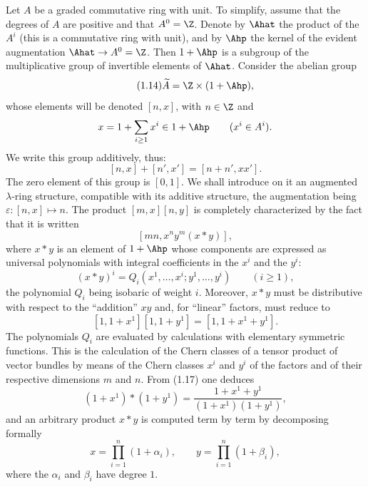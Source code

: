 Let $A$ be a graded commutative ring with unit. To simplify, assume that the degrees of $A$ are positive and that $A^0=\Z$. Denote by $\Ahat$ the product of the $A^i$ (this is a commutative ring with unit), and by $\Ahp$ the kernel of the evident augmentation $\Ahat\to A^0=\Z$. Then $1+\Ahp$ is a subgroup of the multiplicative group of invertible elements of $\Ahat$. Consider the abelian group
\begin{equation}\tag{1.14}
\widetilde A=\Z\times (1+\Ahp),
\end{equation}
whose elements will be denoted $[n,x]$, with $n\in\Z$ and
\[
x=1+\sum_{i\geq 1}x^i\in 1+\Ahp\qquad (x^i\in A^i).
\]
We write this group additively, thus:
\begin{equation}\tag{1.15}
[n,x]+[n',x']=[n+n',xx'].
\end{equation}
The zero element of this group is $[0,1]$. We shall introduce on it an augmented $\lambda$-ring structure, compatible with its additive structure, the augmentation being $\varepsilon:[n,x]\mapsto n$. The product $[m,x][n,y]$ is completely characterized by the fact that it is written
\[
[mn,x^n y^m(x*y)],
\]
where $x*y$ is an element of $1+\Ahp$ whose components are expressed as universal polynomials with integral coefficients in the $x^i$ and the $y^i$:
\begin{equation}\tag{1.16}
(x*y)^i=Q_i(x^1,\ldots,x^i;y^1,\ldots,y^i)\qquad (i\geq 1),
\end{equation}
the polynomial $Q_i$ being isobaric of weight $i$. Moreover, $x*y$ must be distributive with respect to the ``addition'' $xy$ and, for ``linear'' factors, must reduce to
\begin{equation}\tag{1.17}
[1,1+x^1][1,1+y^1]=[1,1+x^1+y^1].
\end{equation}
The polynomials $Q_i$ are evaluated by calculations with elementary symmetric functions. This is the calculation of the Chern classes of a tensor product of vector bundles by means of the Chern classes $x^i$ and $y^i$ of the factors and of their respective dimensions $m$ and $n$. From (1.17) one deduces
\begin{equation}\tag{1.17 bis}
(1+x^1)*(1+y^1)=\frac{1+x^1+y^1}{(1+x^1)(1+y^1)},
\end{equation}
and an arbitrary product $x*y$ is computed term by term by decomposing formally
\[
x=\prod_{i=1}^n(1+\alpha_i),\qquad y=\prod_{i=1}^n(1+\beta_i),
\]
where the $\alpha_i$ and $\beta_i$ have degree $1$.

